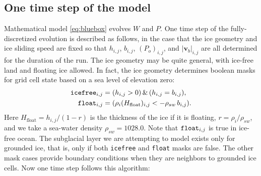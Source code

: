 \documentclass[11pt,final]{amsart}%
\newcommand\bv{\mathbf{v}}
\begin{document}
\subsection*{One time step of the model}  Mathematical model \eqref{eq:bluebox} evolves $W$ and $P$.  One time step of the fully-discretized evolution is described as follows, in the case that the ice geometry and ice sliding speed are fixed so that $h_{i,j}$, $b_{i,j}$, $(P_o)_{i,j}$, and $|\bv_b|_{i,j}$ are all determined for the duration of the run.  The ice geometry may be quite general, with ice-free land and floating ice allowed.  In fact, the ice geometry determines boolean masks for grid cell state based on a sea level of elevation zero:
\begin{align*}
\text{\texttt{icefree}}_{i,j} &= (h_{i,j} > 0)\, \&\, (h_{i,j} = b_{i,j}), \\
\text{\texttt{float}}_{i,j}   &= (\rho_i (H_{\text{float}})_{i,j} < - \rho_{sw}\, b_{i,j}).
\end{align*}
Here $H_{\text{float}}=h_{i,j} / (1 - r)$ is the thickness of the ice if it is floating, $r=\rho_i / \rho_{sw}$, and we take a sea-water density $\rho_{sw}=1028.0$.  Note that $\text{\texttt{float}}_{i,j}$ is true in ice-free ocean.  The subglacial layer we are attempting to model exists only for grounded ice, that is, only if both \texttt{icefree} and \texttt{float} masks are false.  The other mask cases provide boundary conditions when they are neighbors to grounded ice cells.  Now one time step follows this algorithm:
\end{document}
